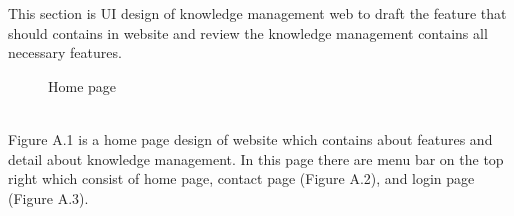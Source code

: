 \documentclass[12pt,oneside,openright,a4paper]{cpe-english-project}
\begin{document}
 This section is UI design of knowledge management web to draft the feature that should 
contains in website and review the knowledge management contains all necessary features. \\ \bigskip
\begin{figure}[!h]\centering
{}
\caption{Home page}\label{fig:Home page}
\end{figure}\\
Figure A.1 is a home page design of website which contains about features and detail 
about knowledge management. In this page there are menu bar on the top right which consist 
of home page, contact page (Figure A.2), and login page (Figure A.3). 
\end{document}
